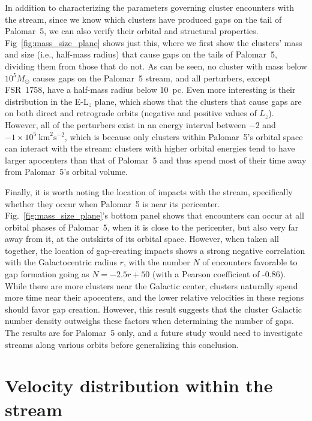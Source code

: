         In addition to characterizing the parameters governing cluster encounters with the stream, since we know which clusters have produced gaps on the tail of Palomar~5, we can also verify their orbital and structural properties. Fig~\ref{fig:mass_size_plane} shows just this, where we first show the clusters' mass and size (i.e., half-mass radius) that cause gaps on the tails of Palomar~5, dividing them from those that do not. As can be seen, no cluster with mass below $10^5 M_\odot$ causes gaps on the Palomar~5 stream, and all perturbers, except FSR~1758, have a half-mass radius below 10~pc. Even more interesting is their distribution in the E-L$_z$ plane, which shows that the clusters that cause gaps are on both direct and retrograde orbits (negative and positive values of $L_z$). However, all of the perturbers exist in an energy interval between $-2$ and $-1 \times10^5~\textrm{km}^2\textrm{s}^{-2}$, which is because only clusters within Palomar~5's orbital space can interact with the stream: clusters with higher orbital energies tend to have larger apocenters than that of Palomar~5 and thus spend most of their time away from Palomar~5's orbital volume. 
    
        Finally, it is worth noting the location of impacts with the stream, specifically whether they occur when Palomar~5 is near its pericenter. Fig.~\ref{fig:mass_size_plane}'s bottom panel shows that encounters can occur at all orbital phases of Palomar~5, when it is close to the pericenter, but also very far away from it, at the outskirts of its orbital space. However, when taken all together, the location of gap-creating impacts shows a strong negative correlation with the Galactocentric radius $r$, with the number $N$ of encounters favorable to gap formation going as $N = -2.5r + 50$ (with a Pearson coefficient of -0.86). While there are more clusters near the Galactic center, clusters naturally spend more time near their apocenters, and the lower relative velocities in these regions should favor gap creation. However, this result suggests that the cluster Galactic number density outweighs these factors when determining the number of gaps. The results are for Palomar~5 only, and a future study would need to investigate streams along various orbits before generalizing this conclusion.




\section{Velocity distribution within the stream}

